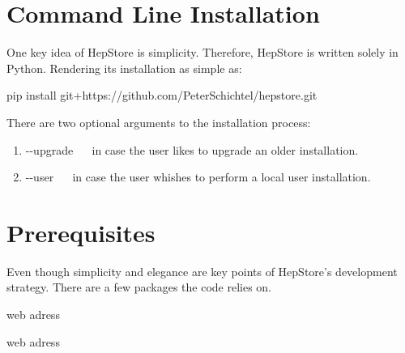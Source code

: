 
\section{Command Line Installation}
One key idea of HepStore is simplicity. Therefore, HepStore is written
solely in Python. Rendering its installation as simple as:
%
\begin{framed}
  \begin{center}
    pip install  git+https://github.com/PeterSchichtel/hepstore.git
  \end{center}
\end{framed}
%
There are two optional arguments to the installation process:
%
\begin{enumerate}
\item -{}-upgrade ~~ in case the user likes to upgrade an older installation.
\item -{}-user ~~ in case the user whishes to perform a local user installation.
\end{enumerate}
%

\section{Prerequisites}
Even though simplicity and elegance are key points of HepStore's
development strategy. There are a few packages the code relies on.
%
\begin{description}
\item[Python 2.7] web adress
\item[Docker] web adress
\end{description}
%
